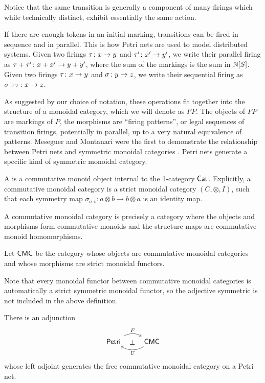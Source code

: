 Notice that the same transition is generally a component of many firings which while technically distinct, exhibit essentially the same action. 

If there are enough tokens in an initial marking, transitions can be fired in sequence and in parallel. This is how Petri nets are used to model distributed systems. Given two firings $\tau \colon x \to y$ and $\tau' \colon x' \to y'$, we write their parallel firing as $\tau + \tau'  \colon x + x' \to y + y'$, where the sum of the markings is the sum in $\mathbb{N}[S]$. Given two firings $\tau \colon x \to y$ and $\sigma \colon y \to z$, we write their sequential firing as $\sigma \circ \tau \colon x \to z$. 

As suggested by our choice of notation, these operations fit together into the structure of a monoidal category, which we will denote as $FP$. The objects of $FP$ are markings of $P$, the morphisms are ``firing patterns'', or legal sequences of transition firings, potentially in parallel, up to a very natural equivalence of patterns. Meseguer and Montanari were the first to demonstrate the relationship between Petri nets and symmetric monoidal categories \cite{monoids}.
Petri nets generate a specific kind of symmetric monoidal category.
\begin{defn}
A  is a commutative monoid object internal to the 1-category $\mathsf{Cat}$. Explicitly, a commutative monoidal category is a strict monoidal category $(C,\otimes,I)$, such that each symmetry map $\sigma_{a,b} \colon a \otimes b \to b \otimes a$ is an identity map.
\end{defn}
\noindent A commutative monoidal category is precisely a category where the objects and morphisms form commutative monoids and the structure maps are commutative monoid homomorphisms. 
\begin{defn}
	Let $\mathsf{CMC}$ be the category whose objects are commutative monoidal categories and whose morphisms are strict monoidal functors.
\end{defn}
\noindent Note that every monoidal functor between commutative monoidal categories is automatically a strict symmetric monoidal functor, so the adjective symmetric is not included in the above definition. 
\begin{prop}
There is an adjunction
\[
\begin{tikzcd}
\Petri \ar[r,bend left,"F"] \ar[r,phantom,"\bot"] & \CMC \ar[l,bend left,"U"] 
\end{tikzcd}
\]
whose left adjoint generates the free commutative monoidal category on a Petri net.
\end{prop}



